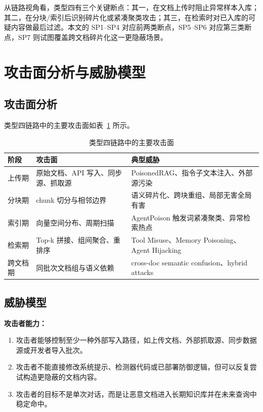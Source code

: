 \documentclass[11pt,a4paper]{ctexart}
\begin{document}
从链路视角看，类型四有三个关键断点：其一，在文档上传时阻止异常样本入库；其二，在分块/索引后识别碎片化或紧凑聚类攻击；其三，在检索时对已入库的可疑内容做最后过滤。本文的 SP1--SP4 对应前两类断点，SP5--SP6 对应第三类断点，SP7 则试图覆盖跨文档碎片化这一更隐蔽场景。

\section{攻击面分析与威胁模型}

\subsection{攻击面分析}
类型四链路中的主要攻击面如表~\ref{tab:type4-attack-surface} 所示。

\begin{table}[H]
\centering
\caption{类型四链路中的主要攻击面}
\label{tab:type4-attack-surface}
\begin{tabular}{p{2.2cm} p{4.4cm} p{6.4cm}}
\toprule
阶段 & 攻击面 & 典型威胁 \\
\midrule
上传期 & 原始文档、API 写入、同步源、抓取源 & PoisonedRAG、指令子文本注入、外部源污染 \\
分块期 & chunk 切分与相邻边界 & 语义碎片化、跨块重组、局部无害全局有害 \\
索引期 & 向量空间分布、周期扫描 & AgentPoison 触发词紧凑聚类、异常检索热点 \\
检索期 & Top-k 拼接、组间聚合、重排序 & Tool Misuse、Memory Poisoning、Agent Hijacking \\
跨文档期 & 同批次文档组与语义依赖 & cross-doc semantic confusion、hybrid attacks \\
\bottomrule
\end{tabular}
\end{table}

\subsection{威胁模型}
\textbf{攻击者能力：}
\begin{enumerate}[leftmargin=2em]
  \item 攻击者能够控制至少一种外部写入路径，如上传文档、外部抓取源、同步数据源或开发者导入批次。
  \item 攻击者不能直接修改系统提示、检测器代码或已部署防御逻辑，但可以反复尝试构造更隐蔽的文档内容。
  \item 攻击者的目标不是单次对话，而是让恶意文档进入长期知识库并在未来查询中稳定命中。
\end{enumerate}
\end{document}
